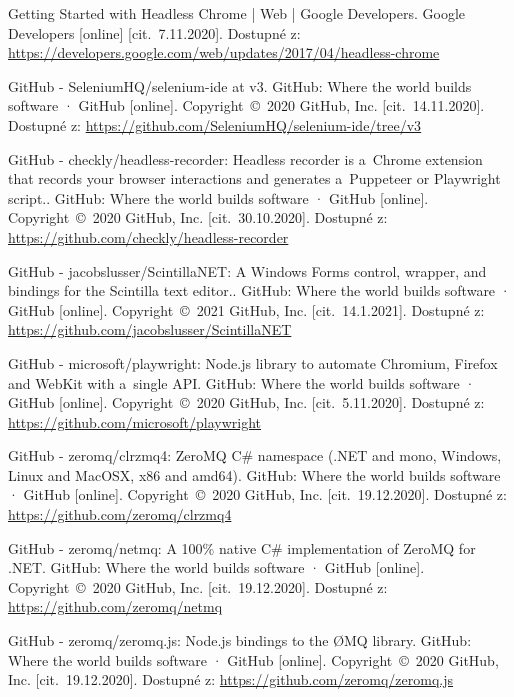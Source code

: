 \begin{thebibliography}{99}
 Getting Started with Headless Chrome  |  Web  |  Google Developers. Google Developers [online] [cit.~7.11.2020]. Dostupné z: \url{https://developers.google.com/web/updates/2017/04/headless-chrome}

 GitHub - SeleniumHQ/selenium-ide at v3. GitHub: Where the world builds software · GitHub [online]. Copyright~©~2020 GitHub, Inc. [cit.~14.11.2020]. Dostupné z: \url{https://github.com/SeleniumHQ/selenium-ide/tree/v3}

 GitHub - checkly/headless-recorder: Headless recorder is a~Chrome extension that records your browser interactions and generates a~Puppeteer or Playwright script.. GitHub: Where the world builds software · GitHub [online]. Copyright~©~2020 GitHub, Inc. [cit.~30.10.2020]. Dostupné z: \url{https://github.com/checkly/headless-recorder}

 GitHub - jacobslusser/ScintillaNET: A Windows Forms control, wrapper, and bindings for the Scintilla text editor.. GitHub: Where the world builds software · GitHub [online]. Copyright~©~2021 GitHub, Inc. [cit.~14.1.2021]. Dostupné z: \url{https://github.com/jacobslusser/ScintillaNET}


 GitHub - microsoft/playwright: Node.js library to automate Chromium, Firefox and WebKit with a~single API. GitHub: Where the world builds software · GitHub [online]. Copyright~©~2020 GitHub, Inc. [cit.~5.11.2020]. Dostupné z: \url{https://github.com/microsoft/playwright}

 GitHub - zeromq/clrzmq4: ZeroMQ C\# namespace (.NET and mono, Windows, Linux and MacOSX, x86 and amd64). GitHub: Where the world builds software · GitHub [online]. Copyright~©~2020 GitHub, Inc. [cit.~19.12.2020]. Dostupné z: \url{https://github.com/zeromq/clrzmq4}

 GitHub - zeromq/netmq: A 100\% native C\# implementation of ZeroMQ for .NET. GitHub: Where the world builds software · GitHub [online]. Copyright~©~2020 GitHub, Inc. [cit.~19.12.2020]. Dostupné z: \url{https://github.com/zeromq/netmq}

 GitHub - zeromq/zeromq.js: Node.js bindings to the ØMQ library. GitHub: Where the world builds software · GitHub [online]. Copyright~©~2020 GitHub, Inc. [cit.~19.12.2020]. Dostupné z: \url{https://github.com/zeromq/zeromq.js}


\end{thebibliography}
